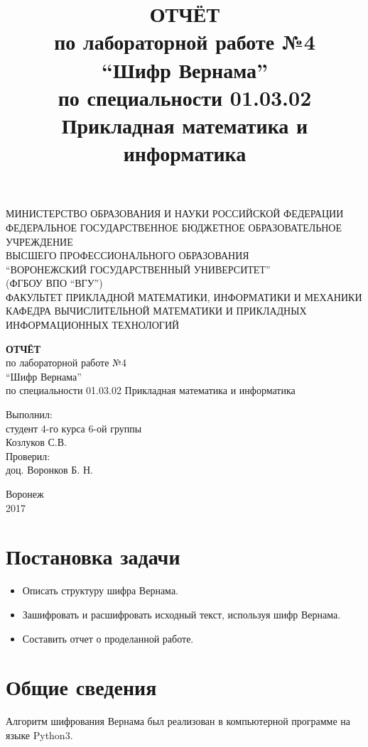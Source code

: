 \documentclass{article}
\title{\textbf{ОТЧЁТ}\\
по лабораторной работе №4\\
``Шифр Вернама''\\
по специальности 01.03.02 Прикладная математика и информатика}
\begin{document}
\begin{center}
МИНИСТЕРСТВО ОБРАЗОВАНИЯ И НАУКИ РОССИЙСКОЙ ФЕДЕРАЦИИ\\
ФЕДЕРАЛЬНОЕ ГОСУДАРСТВЕННОЕ БЮДЖЕТНОЕ ОБРАЗОВАТЕЛЬНОЕ УЧРЕЖДЕНИЕ\\
ВЫСШЕГО ПРОФЕССИОНАЛЬНОГО ОБРАЗОВАНИЯ\\
``ВОРОНЕЖСКИЙ ГОСУДАРСТВЕННЫЙ УНИВЕРСИТЕТ''\\
(ФГБОУ ВПО ``ВГУ'')\\
ФАКУЛЬТЕТ ПРИКЛАДНОЙ МАТЕМАТИКИ, ИНФОРМАТИКИ И МЕХАНИКИ\\
КАФЕДРА ВЫЧИСЛИТЕЛЬНОЙ МАТЕМАТИКИ И ПРИКЛАДНЫХ ИНФОРМАЦИОННЫХ ТЕХНОЛОГИЙ
\end{center}
\vfill
\begin{center}
\textbf{ОТЧЁТ}\\
по лабораторной работе №4\\
``Шифр Вернама''\\
по специальности 01.03.02 Прикладная математика и информатика
\end{center}
\vfill
\begin{flushright}
Выполнил:\\
студент 4-го курса 6-ой группы\\
Козлуков С.В.\\
Проверил:\\
доц. Воронков Б. Н.
\end{flushright}
\begin{center}
Воронеж\\2017
\end{center}
\clearpage
\tableofcontents
\clearpage

\section{Постановка задачи}
\begin{itemize}
\item Описать структуру шифра Вернама.
\item Зашифровать и расшифровать исходный текст, используя шифр Вернама.
\item Составить отчет о проделанной работе.
\end{itemize}

\section{Общие сведения}
Алгоритм шифрования Вернама был реализован
в компьютерной программе на языке Python3.
\end{document}
